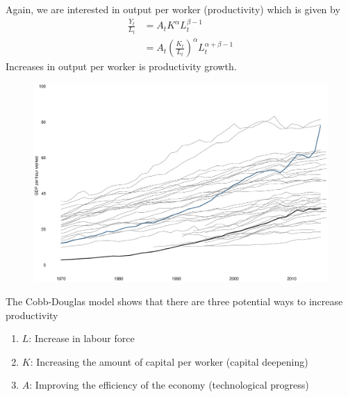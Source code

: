 \documentclass{beamer}
\begin{document}
\begin{frame}
  Again, we are interested in output per worker (productivity) which is given by
  \begin{align}
    \frac{Y_t}{L_t} &= A_tK^{\alpha}L^{\beta-1}_t \\ \nonumber
    &= A_t \left(\frac{K_t}{L_t} \right)^{\alpha}L_t^{\alpha+\beta-1}
  \end{align}
  \medskip
  Increases in output per worker is productivity growth.
\end{frame}

\begin{frame}
  \begin{figure}
    \includegraphics[scale=.3]{productivity.eps}
  \end{figure}
\end{frame}

\begin{frame}
 The Cobb-Douglas model shows that there are three potential ways to increase productivity
\begin{enumerate}
  \item $L$: Increase in labour force  
  \item $K$: Increasing the amount of capital per worker (capital deepening)
  \item $A$: Improving the efficiency of the economy (technological progress)  
\end{enumerate}
\end{frame}
\end{document}
